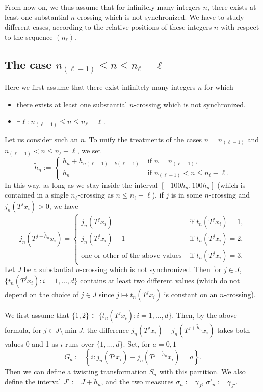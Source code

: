\documentclass[AHL,Unicode,longabstracts]{cedram}
\newcommand{\egdef}{:=}
\let\oldexists\exists
\renewcommand*{\exists}{\mathrel{\oldexists}}
\begin{document}
From now on, we thus assume that for infinitely many integers $n$, there exists at least one substantial $n$-crossing which is not synchronized. We have to study different cases, according to the relative positions of these integers $n$ with respect to the sequence $(n_\ell)$.



\subsection{The case \texorpdfstring{$n_{(\ell-1)} \le n \le n_{\ell}-\ell$}{n(l-1) le n le nl-l}}\label{sec:easycase}
Here we first assume that there exist infinitely many integers $n$ for which
\begin{itemize}
\item there exists at least one substantial $n$-crossing which is not synchronized.
\item $\exists\ell: n_{(\ell-1)} \le n \le n_{\ell}-\ell$.
\end{itemize}

Let us consider such an $n$. To unify the treatments of the cases $n=n_{(\ell-1)}$ and $n_{(\ell-1)} < n \le n_{\ell}-\ell$, we set
\[
\tilde h_n \egdef
\begin{cases}
h_{n}+h_{n(\ell-1)-k(\ell-1)} &\text{ if }n=n_{(\ell-1)},\\
h_n &\text{ if }n_{(\ell-1)} < n \le n_{\ell}-\ell.
\end{cases}
\]
In this way, as long as we stay inside the interval $[-100 h_n, 100h_n]$ (which is contained in a single $n_\ell$-crossing as $n \le n_{\ell}-\ell$), if $j$ is in some $n$-crossing and $j_n(T^jx_i)>0$, we have
\[
j_n\left(T^{j+\tilde h_n }x_i\right) =
\begin{cases}
j_n\left(T^{j}x_i\right) &\text{ if }t_n(T^jx_{i})=1,\\
j_n\left(T^{j}x_i\right) -1 &\text{ if }t_n(T^jx_{i})=2,\\
\text{one or other of the above values} &\text{ if }t_n(T^jx_{i})=3.
\end{cases}
\]
Let $J$ be a substantial $n$-crossing which is not synchronized. Then for $j\in J$, $\{t_n(T^j x_i):i=1,\ldots,d\}$ contains at least two different values (which do not depend on the choice of $j\in J$ since $j\mapsto t_n(T^jx_i)$ is constant on an $n$-crossing).

We first assume that $\{1,2\}\subset \{t_n(T^j x_i):i=1,\ldots,d\}$. Then, by the above formula, for $j\in J\setminus \min J$, the difference $j_n\left(T^{j}x_i\right) - j_n\left(T^{j+\tilde h_n }x_i\right)$ takes both values 0 and 1 as $i$ runs over $\{1,\ldots,d\}$. Set, for $a=0,1$
\[
G_a\egdef \left\{i: j_n\left(T^{j}x_i\right) - j_n\left(T^{j+\tilde h_n }x_i\right) = a\right\}.
\]
Then we can define a twisting transformation $S_n$ with this partition. We also define the interval $J'\egdef J+\tilde h_n $, and the two measures $\sigma_n\egdef \gamma_{J}$, $\sigma'_n\egdef \gamma_{J'}$.
\end{document}
